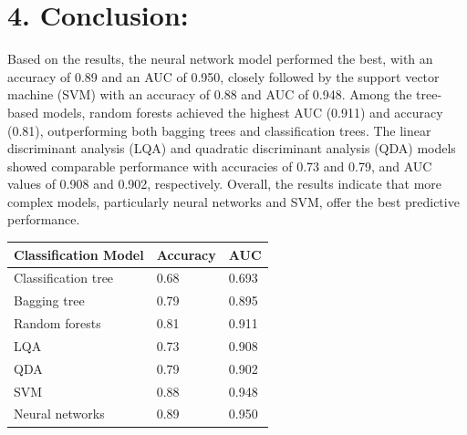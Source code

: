 \documentclass[
  12pt,
  letterpaper,
  DIV=11,
  numbers=noendperiod]{scrartcl}
\begin{document}
\section{4. Conclusion:}\label{conclusion}

Based on the results, the neural network model performed the best, with
an accuracy of 0.89 and an AUC of 0.950, closely followed by the support
vector machine (SVM) with an accuracy of 0.88 and AUC of 0.948. Among
the tree-based models, random forests achieved the highest AUC (0.911)
and accuracy (0.81), outperforming both bagging trees and classification
trees. The linear discriminant analysis (LQA) and quadratic discriminant
analysis (QDA) models showed comparable performance with accuracies of
0.73 and 0.79, and AUC values of 0.908 and 0.902, respectively. Overall,
the results indicate that more complex models, particularly neural
networks and SVM, offer the best predictive performance.

\begin{longtable}[]{@{}lll@{}}
\toprule\noalign{}
Classification Model & Accuracy & AUC \\
\midrule\noalign{}
\endhead
\bottomrule\noalign{}
\endlastfoot
Classification tree & 0.68 & 0.693 \\
Bagging tree & 0.79 & 0.895 \\
Random forests & 0.81 & 0.911 \\
LQA & 0.73 & 0.908 \\
QDA & 0.79 & 0.902 \\
SVM & 0.88 & 0.948 \\
Neural networks & 0.89 & 0.950 \\
\end{longtable}
\end{document}
